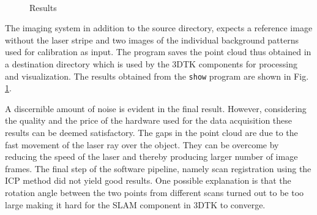 \begin{figure}[ht!]
\quad
{}\\
\caption{Results}
\label{figure:results}
\end{figure}

The imaging system in addition to the source directory, expects a reference
image without the laser stripe and two images of the individual background
patterns used for calibration as input. The program saves the point cloud thus
obtained in a destination directory which is used by the \ac{3DTK} components
for processing and visualization. The results obtained from the
\texttt{show} program are shown in Fig. \ref{figure:results}.

A discernible amount of noise is evident in the final result. However,
considering the quality and the price of the hardware used for the data
acquisition these results can be deemed satisfactory. The gaps in the point
cloud are due to the fast movement of the laser ray over the object. They can
be overcome by reducing the speed of the laser and thereby producing larger
number of image frames. The final step of the software pipeline, namely scan
registration using the ICP method did not yield good results. One possible
explanation is that the rotation angle between the two points from different
scans turned out to be too large making it hard for the \ac{SLAM} component in
\ac{3DTK} to converge.
